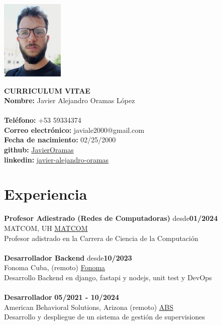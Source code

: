 \documentclass{article}
\begin{document}
\pagestyle{empty} %

\begin{center}
\begin{minipage}[t]{0.2\textwidth}
\vspace{0pt}
\includegraphics[width=3cm]{img.png}
\end{minipage}
\hspace{1cm}
\begin{minipage}[t]{0.7\textwidth}
\vspace{0pt}
\textbf{CURRICULUM VITAE}\\
\textbf{Nombre:} Javier Alejandro Oramas López\\
\\
\textbf{Teléfono:} +53 59334374 \\
\textbf{Correo electrónico:} javiale2000@gmail.com \\
\textbf{Fecha de nacimiento:} 02/25/2000\\
\textbf{github:} \href{https://github.com/JavierOramas}{JavierOramas} \\
\textbf{linkedin:} \href{https://www.linkedin.com/in/javier-alejandro-oramas-l%C3%B3pez-7ab47b160/}{javier-alejandro-oramas} \\
\end{minipage}
\end{center}

\section*{Experiencia}
    \textbf{Profesor Adiestrado (Redes de Computadoras)} \hfill desde\textbf{01/2024}\\ 
    MATCOM, UH
    \href{matcom.uh.cu}{MATCOM}\\
    Profesor adistrado en la Carrera de Ciencia de la Computación\\
    \vspace{0.1cm}\\
    \textbf{Desarrollador Backend} \hfill desde\textbf{10/2023}\\ 
    Fonoma Cuba, (remoto)
    \href{fonoma.com}{Fonoma}\\
    Desarrollo Backend en django, fastapi y nodejs, unit test y DevOps\\
    \vspace{0.1cm}\\
    \textbf{Desarrollador} \hfill \textbf{05/2021 - 10/2024}\\ 
    American Behavioral Solutions, Arizona (remoto)
    \href{americanbehavioralsolutions.com}{ABS}\\
    Desarrollo y despliegue de un sistema de gestión de supervisiones\\
\end{document}
